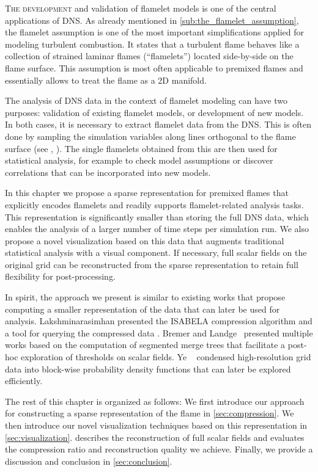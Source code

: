 \vspace{-2\baselineskip}\lettrine[loversize=0.02, lhang=0.03,
findent=-0.7pt]{T}{he development} and validation of flamelet models is one of
the central applications of \ac{DNS}.
%
As already mentioned in \cref{sub:the_flamelet_assumption}, the flamelet
assumption is one of the most important simplifications applied for modeling
turbulent combustion.
%
It states that a turbulent flame behaves like a collection of strained laminar
flames (``flamelets'') located side-by-side on the flame surface.
%
This assumption is most often applicable to premixed flames and essentially
allows to treat the flame as a \ac{2D} manifold.
%

%
The analysis of \ac{DNS} data in the context of flamelet modeling can have
two purposes: validation of existing flamelet models, or development of new
models.
%
In both cases, it is necessary to extract flamelet data from the \ac{DNS}.
%
This is often done by sampling the simulation variables along lines orthogonal
to the flame surface (see \eg, \cite{Zistl2009}).
%
The single flamelets obtained from this are then used for statistical analysis,
for example to check model assumptions or discover correlations that can be
incorporated into new models.
%

%
In this chapter we propose a sparse representation for premixed flames that
explicitly encodes flamelets and readily supports flamelet-related analysis
tasks.
%
This representation is significantly smaller than storing the full DNS data,
which enables the analysis of a larger number of time steps per simulation run.
%
We also propose a novel visualization based on this data that augments
traditional statistical analysis with a visual component.
%
If necessary, full scalar fields on the original grid can be reconstructed
from the sparse representation to retain full flexibility for post-processing.
%

%
In spirit, the approach we present is similar to existing works that propose
computing a smaller representation of the data that can later be used for
analysis.
%
Lakshminarasimhan \etal presented the ISABELA compression algorithm
\cite{Lakshminarasimhan2011} and a tool for querying the compressed data
\cite{Lakshminarasimhan2011a}.
%
Bremer and Landge~\cite{Bremer2009,Bremer2011,Bremer2010,Landge2014} presented
multiple works based on the computation of segmented merge trees that facilitate
a post-hoc exploration of thresholds on scalar fields.
%
Ye \etal~\cite{Ye2016} condensed high-resolution grid data into block-wise
probability density functions that can later be explored efficiently.
%

%
The rest of this chapter is organized as follows:
%
We first introduce our approach for constructing a sparse representation of the
flame in \cref{sec:compression}.
%
We then introduce our novel visualization techniques based on this
representation in \cref{sec:visualization}.
%
 describes the reconstruction of full scalar fields and
evaluates the compression ratio and reconstruction quality we achieve.
%
Finally, we provide a discussion and conclusion in \cref{sec:conclusion}.
%